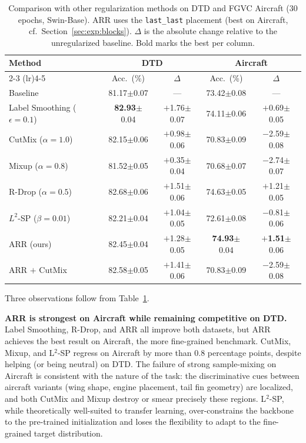 \documentclass[review,12pt,authoryear]{elsarticle}
\newcommand{\std}[1]{{\scriptsize$\pm$#1}}
\newcommand{\method}{ARR}
\begin{document}
\begin{table}[t]
\centering
\caption{Comparison with other regularization methods on DTD and FGVC Aircraft ($30$ epochs, Swin-Base). \method{} uses the \texttt{last\_last} placement (best on Aircraft, cf.\ Section~\ref{sec:exp:blocks}). $\Delta$ is the absolute change relative to the unregularized baseline. Bold marks the best per column.}
\label{tab:comparison}
\small
\begin{tabular}{lcccc}
\toprule
\multirow{2}{*}{Method} & \multicolumn{2}{c}{DTD} & \multicolumn{2}{c}{Aircraft} \\
\cmidrule(lr){2-3} \cmidrule(lr){4-5}
 & Acc.\ (\%) & $\Delta$ & Acc.\ (\%) & $\Delta$ \\
\midrule
Baseline                         & 81.17\std{0.07}          & ---   & 73.42\std{0.08}          & ---   \\
Label Smoothing ($\epsilon=0.1$) & \textbf{82.93}\std{0.04} & $+$1.76\std{0.07} & 74.11\std{0.06}        & $+$0.69\std{0.05} \\
CutMix ($\alpha=1.0$)            & 82.15\std{0.06}          & $+$0.98\std{0.06} & 70.83\std{0.09}        & $-$2.59\std{0.08} \\
Mixup ($\alpha=0.8$)             & 81.52\std{0.05}          & $+$0.35\std{0.04} & 70.68\std{0.07}        & $-$2.74\std{0.07} \\
R-Drop ($\alpha=0.5$)            & 82.68\std{0.06}          & $+$1.51\std{0.06} & 74.63\std{0.05}        & $+$1.21\std{0.05} \\
$L^2$-SP ($\beta=0.01$)          & 82.21\std{0.04}          & $+$1.04\std{0.05} & 72.61\std{0.08}        & $-$0.81\std{0.06} \\
\method{} (ours)                       & 82.45\std{0.04}          & $+$1.28\std{0.05} & \textbf{74.93}\std{0.04} & $+$\textbf{1.51}\std{0.06} \\
\method{} $+$ CutMix                   & 82.58\std{0.05}          & $+$1.41\std{0.06} & 70.83\std{0.09}        & $-$2.59\std{0.08} \\
\bottomrule
\end{tabular}
\end{table}

Three observations follow from Table~\ref{tab:comparison}.

\textbf{\method{} is strongest on Aircraft while remaining competitive on DTD.}
Label Smoothing, R-Drop, and \method{} all improve both datasets, but \method{} achieves the best result on Aircraft, the more fine-grained benchmark.
CutMix, Mixup, and L$^2$-SP regress on Aircraft by more than $0.8$ percentage points, despite helping (or being neutral) on DTD.
The failure of strong sample-mixing on Aircraft is consistent with the nature of the task: the discriminative cues between aircraft variants (wing shape, engine placement, tail fin geometry) are localized, and both CutMix and Mixup destroy or smear precisely these regions.
L$^2$-SP, while theoretically well-suited to transfer learning, over-constrains the backbone to the pre-trained initialization and loses the flexibility to adapt to the fine-grained target distribution.
\end{document}
